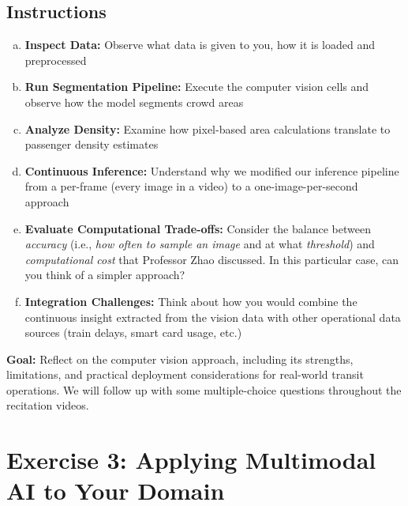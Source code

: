 \documentclass[11pt]{article}
\begin{document}
\subsection*{Instructions}
\begin{enumerate}[(a)]
\item \textbf{Inspect Data:} Observe what data is given to you, how it is loaded and preprocessed
\item \textbf{Run Segmentation Pipeline:} Execute the computer vision cells and observe how the model segments crowd areas
\item \textbf{Analyze Density:} Examine how pixel-based area calculations translate to passenger density estimates
\item \textbf{Continuous Inference:} Understand why we modified our inference pipeline from a per-frame (every image in a video) to a one-image-per-second approach
\item \textbf{Evaluate Computational Trade-offs:} Consider the balance between \textit{accuracy} (i.e., \textit{how often to sample an image} and at what \textit{threshold}) and \textit{computational cost} that Professor Zhao discussed. In this particular case, can you think of a simpler approach?
\item \textbf{Integration Challenges:} Think about how you would combine the continuous insight extracted from the vision data with other operational data sources (train delays, smart card usage, etc.)
\end{enumerate}

\noindent\textbf{Goal:} Reflect on the computer vision approach, including its strengths, limitations, and practical deployment considerations for real-world transit operations. We will follow up with some multiple-choice questions throughout the recitation videos.

\section*{Exercise 3: Applying Multimodal AI to Your Domain}

\begin{center}
\end{center}
\end{document}
